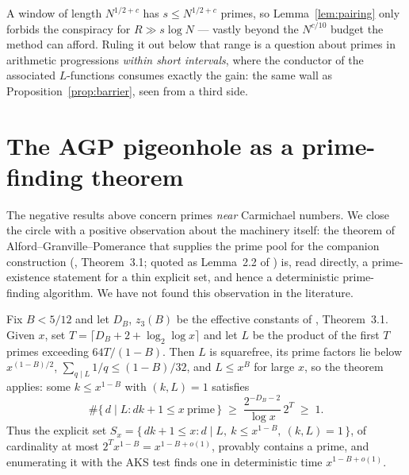 \documentclass[11pt]{amsart}
\begin{document}
A window of length $N^{1/2+c}$ has $s \le N^{1/2+c}$ primes, so
Lemma~\ref{lem:pairing} only forbids the conspiracy for
$R \gg s \log N$ --- vastly beyond the $N^{c/10}$ budget the method can
afford. Ruling it out below that range is a question about primes in
arithmetic progressions \emph{within short intervals}, where the conductor of
the associated $L$-functions consumes exactly the gain: the same wall as
Proposition~\ref{prop:barrier}, seen from a third side.

\section{The AGP pigeonhole as a prime-finding theorem}
\label{sec:agpset}

The negative results above concern primes \emph{near} Carmichael numbers. We
close the circle with a positive observation about the machinery itself: the
theorem of Alford--Granville--Pomerance that supplies the prime pool for the
companion construction (\cite{AGP}, Theorem~3.1; quoted as Lemma~2.2 of
\cite{Bro}) is, read directly, a prime-existence statement for a thin explicit
set, and hence a deterministic prime-finding algorithm. We have not found this
observation in the literature.

Fix $B < 5/12$ and let $D_B$, $z_3(B)$ be the effective constants of
\cite{AGP}, Theorem~3.1. Given $x$, set $T = \lceil D_B + 2 + \log_2 \log x
\rceil$ and let $L$ be the product of the first $T$ primes exceeding
$64T/(1-B)$. Then $L$ is squarefree, its prime factors lie below
$x^{(1-B)/2}$, $\sum_{q \mid L} 1/q \le (1-B)/32$, and $L \le x^{B}$ for
large $x$, so the theorem applies: some $k \le x^{1-B}$ with $(k, L) = 1$
satisfies
\[
\#\{\, d \mid L : dk + 1 \le x \ \text{prime} \,\}
\;\ge\; \frac{2^{-D_B-2}}{\log x}\, 2^{T} \;\ge\; 1 .
\]
Thus the explicit set
$S_x = \{\, dk+1 \le x : d \mid L,\ k \le x^{1-B},\ (k,L)=1 \,\}$, of
cardinality at most $2^{T} x^{1-B} = x^{1-B+o(1)}$, provably contains a
prime, and enumerating it with the AKS test finds one in deterministic time
$x^{1-B+o(1)}$.
\end{document}
